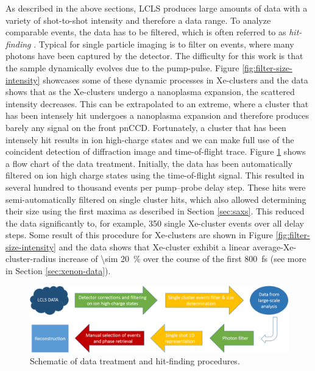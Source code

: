 As described in the above sections, LCLS produces large amounts of data with a variety of shot-to-shot intensity and therefore a data range. To analyze comparable events, the data has to be filtered, which is often referred to as \textit{hit-finding} \cite{Gorkhover-2012-PRL,Daurer-2016-JAC,Foucar-2016-JAC}. Typical for single particle imaging is to filter on events, where many photons have been captured by the detector. The difficulty for this work is that the sample dynamically evolves due to the pump-pulse. Figure \ref{fig:filter-size-intensity} showcases some of these dynamic processes in Xe-clusters and the data shows that as the Xe-clusters undergo a nanoplasma expansion, the scattered intensity decreases. This can be extrapolated to an extreme, where a cluster that has been intensely hit undergoes a nanoplasma expansion and therefore produces barely any signal on the front pnCCD. Fortunately, a cluster that has been intensely hit results in ion high-charge states and we can make full use of the coincident detection of diffraction image and time-of-flight trace. Figure \ref{fig:data-flow-chart} shows a flow chart of the data treatment. Initially, the data has been automatically filtered on ion high charge states using the time-of-flight signal. This resulted in several hundred to thousand events per pump--probe delay step. These hits were semi-automatically filtered on single cluster hits, which also allowed determining their size using the first maxima as described in Section \ref{sec:saxs}. This reduced the data significantly to, for example, 350 single Xe-cluster events over all delay steps. Some result of this procedure for Xe-clusters are shown in Figure \ref{fig:filter-size-intensity} and the data shows that Xe-cluster exhibit a linear average-Xe-cluster-radius increase of \SI{\sim 20}{\percent} over the course of the first \SI{800}{\femto\second} (see more in Section \ref{sec:xenon-data}).\\[1\baselineskip]
\begin{figure}
	\centering
		\includegraphics[width=1.00\textwidth]{images/data-flow-chart.png}
	\caption{Schematic of data treatment and hit-finding procedures.}
	\label{fig:data-flow-chart}
\end{figure}
